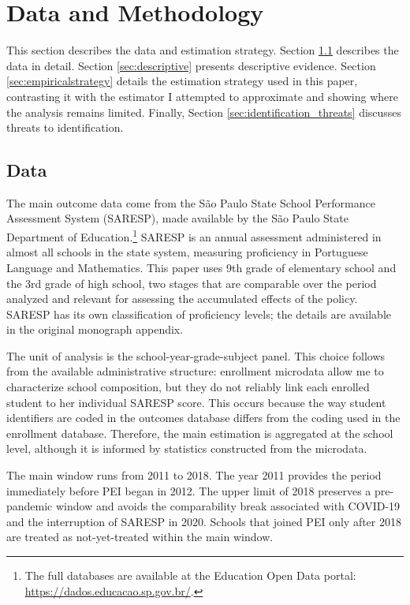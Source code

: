 \section{Data and Methodology} \label{sec:methodsanddata}

This section describes the data and estimation strategy. Section \ref{sec:data} describes the data in detail. Section \ref{sec:descriptive} presents descriptive evidence. Section \ref{sec:empiricalstrategy} details the estimation strategy used in this paper, contrasting it with the estimator I attempted to approximate and showing where the analysis remains limited. Finally, Section \ref{sec:identification_threats} discusses threats to identification.

\subsection{Data} \label{sec:data}

The main outcome data come from the São Paulo State School Performance Assessment System (SARESP), made available by the São Paulo State Department of Education.\footnote{The full databases are available at the Education Open Data portal: \url{https://dados.educacao.sp.gov.br/}.} SARESP is an annual assessment administered in almost all schools in the state system, measuring proficiency in Portuguese Language and Mathematics. This paper uses 9th grade of elementary school and the 3rd grade of high school, two stages that are comparable over the period analyzed and relevant for assessing the accumulated effects of the policy. SARESP has its own classification of proficiency levels; the details are available in the original monograph appendix.

The unit of analysis is the school-year-grade-subject panel. This choice follows from the available administrative structure: enrollment microdata allow me to characterize school composition, but they do not reliably link each enrolled student to her individual SARESP score. This occurs because the way student identifiers are coded in the outcomes database differs from the coding used in the enrollment database. Therefore, the main estimation is aggregated at the school level, although it is informed by statistics constructed from the microdata.

The main window runs from 2011 to 2018. The year 2011 provides the period immediately before PEI began in 2012. The upper limit of 2018 preserves a pre-pandemic window and avoids the comparability break associated with COVID-19 and the interruption of SARESP in 2020. Schools that joined PEI only after 2018 are treated as not-yet-treated within the main window.

